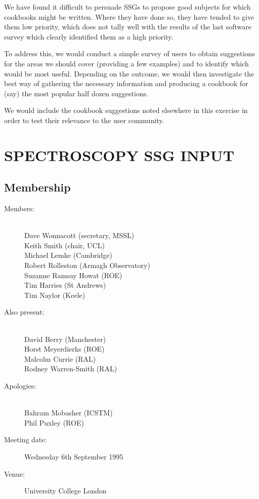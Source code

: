 {We have found it difficult to persuade SSGs to propose good subjects
for which cookbooks might be written. Where they have done so, they
have tended to give them low priority, which does not tally well with
the results of the last software survey which clearly identified them
as a high priority.

To address this, we would conduct a simple survey of users to obtain
suggestions for the areas we should cover (providing a few examples)
and to identify which would be most useful. Depending on the outcome,
we would then investigate the best way of gathering the necessary
information and producing a cookbook for (say) the most popular half
dozen suggestions.

We would include the cookbook suggestions noted elsewhere in this
exercise in order to test their relevance to the user community.}

\newpage
\appendix
\section{SPECTROSCOPY SSG INPUT}

\subsection{Membership}

\begin{description}
\item[Members:]\mbox{}\\
Dave Wonnacott (secretary, MSSL)\\
Keith Smith (chair, UCL)\\
Michael Lemke (Cambridge)\\
Robert Rolleston (Armagh Observatory)\\
Suzanne Ramsay Howat (ROE)\\
Tim Harries (St Andrews)\\
Tim Naylor (Keele)

\item[Also present:]\mbox{}\\
David Berry (Manchester)\\
Horst Meyerdierks (ROE)\\
Malcolm Currie (RAL)\\
Rodney Warren-Smith (RAL)

\item[Apologies:]\mbox{}\\
Bahram Mobasher (ICSTM)\\
Phil Puxley (ROE)

\item[Meeting date:]Wednesday 6th September 1995

\item[Venue:]University College London
\end{description}

